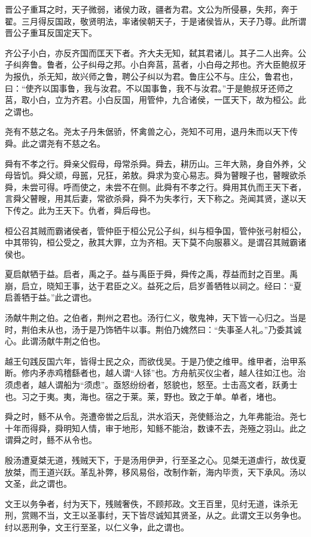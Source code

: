 \documentclass[12pt,UTF8]{ctexbook}
\begin{document}
晋公子重耳之时，天子微弱，诸侯力政，疆者为君。文公为所侵暴，失邦，奔于翟。三月得反国政，敬贤明法，率诸侯朝天子，于是诸侯皆从，天子乃尊。此所谓晋公子重耳反国定天下。

齐公子小白，亦反齐国而匡天下者。齐大夫无知，弑其君诸儿。其子二人出奔。公子纠奔鲁。鲁者，公子纠母之邦。小白奔莒，莒者，小白母之邦也。齐大臣鲍叔牙为报仇，杀无知，故兴师之鲁，聘公子纠以为君。鲁庄公不与。庄公，鲁君也，曰：“使齐以国事鲁，我与汝君。不以国事鲁，我不与汝君。”于是鲍叔牙还师之莒，取小白，立为齐君。小白反国，用管仲，九合诸侯，一匡天下，故为桓公。此之谓也。

尧有不慈之名。尧太子丹朱倨骄，怀禽兽之心，尧知不可用，退丹朱而以天下传舜。此之谓尧有不慈之名。

舜有不孝之行。舜亲父假母，母常杀舜。舜去，耕历山。三年大熟，身自外养，父母皆饥。舜父顽，母嚚，兄狂，弟敖。舜求为变心易志。舜为瞽瞍子也，瞽瞍欲杀舜，未尝可得。呼而使之，未尝不在侧。此舜有不孝之行。舜用其仇而王天下者，言舜父瞽瞍，用其后妻，常欲杀舜，舜不为失孝行，天下称之。尧闻其贤，遂以天下传之。此为王天下。仇者，舜后母也。

桓公召其贼而霸诸侯者，管仲臣于桓公兄公子纠，纠与桓争国，管仲张弓射桓公，中其带钩，桓公受之，赦其大罪，立为齐相。天下莫不向服慕义。是谓召其贼霸诸侯也。

夏启献牺于益。启者，禹之子。益与禹臣于舜，舜传之禹，荐益而封之百里。禹崩，启立，晓知王事，达于君臣之义。益死之后，启岁善牺牲以祠之。经曰：“夏启善牺于益。”此之谓也。

汤献牛荆之伯。之伯者，荆州之君也。汤行仁义，敬鬼神，天下皆一心归之。当是时，荆伯未从也，汤于是乃饰牺牛以事。荆伯乃媿然曰：“失事圣人礼。”乃委其诚心。此谓汤献牛荆之伯也。

越王句践反国六年，皆得士民之众，而欲伐吴。于是乃使之维甲。维甲者，治甲系断。修内矛赤鸡稽繇者也，越人谓“人铩”也。方舟航买仪尘者，越人往如江也。治须虑者，越人谓船为“须虑”。亟怒纷纷者，怒貌也，怒至。士击高文者，跃勇士也。习之于夷。夷，海也。宿之于莱。莱，野也。致之于单。单者，堵也。

舜之时，鲧不从令。尧遭帝喾之后乱，洪水滔天，尧使鲧治之，九年弗能治。尧七十年而得舜，舜明知人情，审于地形，知鲧不能治，数谏不去，尧殛之羽山。此之谓舜之时，鲧不从令也。

殷汤遭夏桀无道，残贼天下，于是汤用伊尹，行至圣之心。见桀无道虐行，故伐夏放桀，而王道兴跃。革乱补弊，移风易俗，改制作新，海内毕贡，天下承风。汤以文圣，此之谓也。

文王以务争者，纣为天下，残贼奢佚，不顾邦政。文王百里，见纣无道，诛杀无刑，赏赐不当，文王以圣事纣，天下皆尽诚知其贤圣，从之。此谓文王以务争也。纣以恶刑争，文王行至圣，以仁义争，此之谓也。
\end{document}
